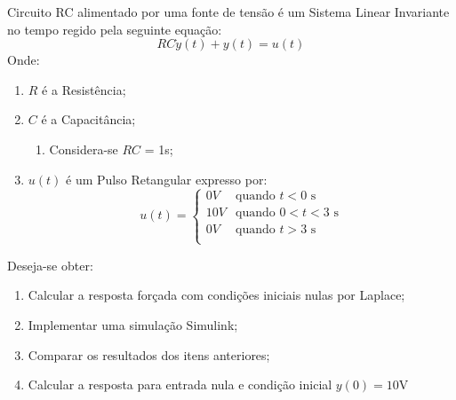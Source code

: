 \documentclass{article}
\begin{document}
            \begin{exercise}
                Circuito RC alimentado por uma fonte de tensão é um Sistema Linear Invariante no tempo regido pela seguinte equação:
                    \begin{equation*}
                        RC\dot{y}(t) + y(t) = u(t)
                    \end{equation*}
                Onde:
                    \begin{enumerate}[noitemsep]
                        \item $R$ é a Resistência;
                        \item $C$ é a Capacitância;
                            \begin{enumerate}
                                \item Considera-se $RC$ = 1s;
                            \end{enumerate}
                        \item $u(t)$ é um Pulso Retangular expresso por:
                            \begin{equation*}
                                u(t) = 
                                \begin{cases}
                                    0V  & \text{quando $t < 0$ s}\\
                                    10V & \text{quando $0 < t < 3$ s}\\
                                    0V  & \text{quando $t > 3$ s}\\
                                \end{cases}
                            \end{equation*}
                    \end{enumerate}
                Deseja-se obter:
                    \begin{enumerate}[label=(\alph*)]
                        \item \label{ex:1A}Calcular a resposta forçada com condições iniciais nulas por Laplace;

                        \item \label{ex:1B}Implementar uma simulação Simulink;

                        \item \label{ex:1C}Comparar os resultados dos itens anteriores;

                        \item \label{ex:1D}Calcular a resposta para entrada nula e condição inicial $y(0)= 10$V
                    \end{enumerate}
            \end{exercise}
\end{document}
